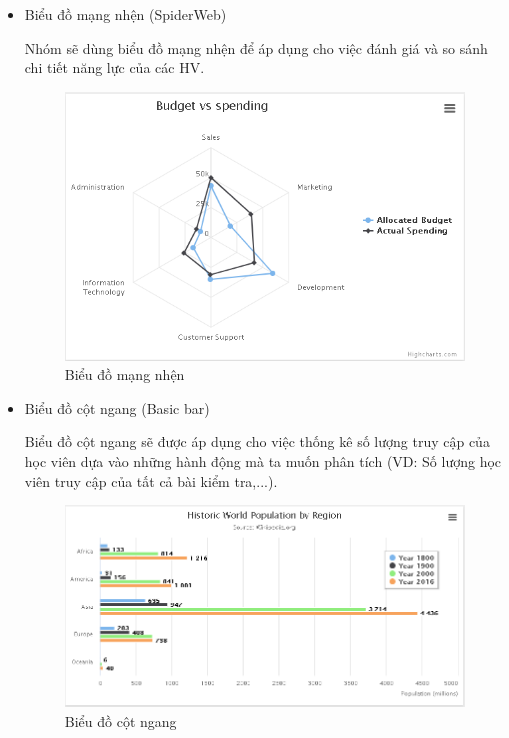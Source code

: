 \begin{itemize}
	\item Biểu đồ mạng nhện (SpiderWeb)
	
	Nhóm sẽ dùng biểu đồ mạng nhện để áp dụng cho việc đánh giá và so sánh chi tiết năng lực của các HV.
	\begin{center}
		\begin{figure}[htp]
			\begin{center}
				\includegraphics[scale=1]{img/radar}
			\end{center}
			\caption{Biểu đồ mạng nhện}
			\label{refhinh16}
		\end{figure}
	\end{center}
	
	\newpage
	\item Biểu đồ cột ngang (Basic bar)
	
	Biểu đồ cột ngang sẽ được áp dụng cho việc thống kê số lượng truy cập của học viên dựa vào những hành động mà ta muốn phân tích (VD: Số lượng học viên truy cập của tất cả bài kiểm tra,...).
	
	\begin{center}
		\begin{figure}[htp]
			\begin{center}
				\includegraphics[scale=0.7]{img/bar}
			\end{center}
			\caption{Biểu đồ cột ngang}
			\label{refhinh17}
		\end{figure}
	\end{center}
	

\end{itemize}
